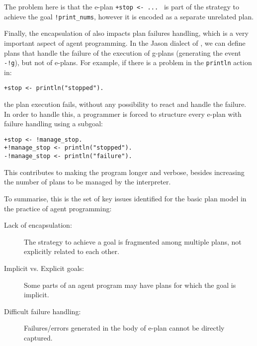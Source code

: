 \noindent The problem here is that the e-plan \texttt{+stop <- ... } is
part of the strategy to achieve the goal \texttt{!print\_nums}, however
it is encoded as a separate unrelated plan.


Finally, the encapsulation of  also impacts  plan failures handling, which is a very
important aspect of agent programming.
%
In the Jason dialect of {\asl}, we can define plans that handle the
failure of the execution of g-plans (generating the event
\texttt{-!g}), but not of e-plans.
%
For example, if there is a problem in the \texttt{println} action in:

\begin{small}
\begin{verbatim}
+stop <- println("stopped").
\end{verbatim}
\end{small}

\noindent the plan execution fails, without any possibility to react
and handle the failure.
%
In order to handle this, a programmer is forced to structure every
e-plan with failure handling using a subgoal:

\begin{small}
\begin{verbatim}
+stop <- !manage_stop.
+!manage_stop <- println("stopped").
-!manage_stop <- println("failure").
\end{verbatim}
\end{small}

\noindent This contributes to making the program longer and verbose,
besides increasing the number of plans to be managed by the
interpreter.


\bigskip

To summarise, this is the set of key issues identified for the basic
plan model in the practice of agent programming:
%
\begin{description}
%
\item[Lack of encapsulation:] The strategy to achieve a goal is
  fragmented among multiple plans, not explicitly related to each
  other.
%
\item[Implicit vs. Explicit goals:] Some parts of an agent program may
  have plans for which the goal is implicit.
%
\item[Difficult failure handling:] Failures/errors generated in the
  body of e-plan cannot be directly captured.
%
\end{description}



